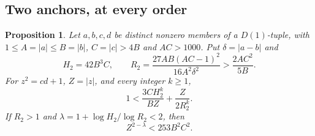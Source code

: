 \documentclass[12pt]{article}
\newtheorem{proposition}[theorem]{Proposition}
\numberwithin{equation}{section}
\begin{document}
\subsection{Two anchors, at every order}

\begin{proposition}\label{lem:ordinary-all-orders}
Let $a,b,c,d$ be distinct nonzero members of a $D(1)$-tuple, with
$1\le A=|a|\le B=|b|$, $C=|c|>4B$ and $AC>1000$.
Put $\delta=|a-b|$ and
\[
 H_2=42B^3C,\qquad
 R_2=\frac{27AB(AC-1)^2}{16A^2\delta^2}
      >\frac{2AC^2}{5B}.
\]
For $z^2=cd+1$, $Z=|z|$, and every integer $k\ge1$,
\begin{equation}\label{eq:ordinary-integer-k}
 1<\frac{3CH_2^k}{BZ}+\frac{Z}{2R_2^k}.
\end{equation}
If $R_2>1$ and $\lambda=1+\log H_2/\log R_2<2$, then
\begin{equation}\label{eq:ordinary-continuous}
 Z^{2-\lambda}<253B^2C^2.
\end{equation}
\end{proposition}
\end{document}
